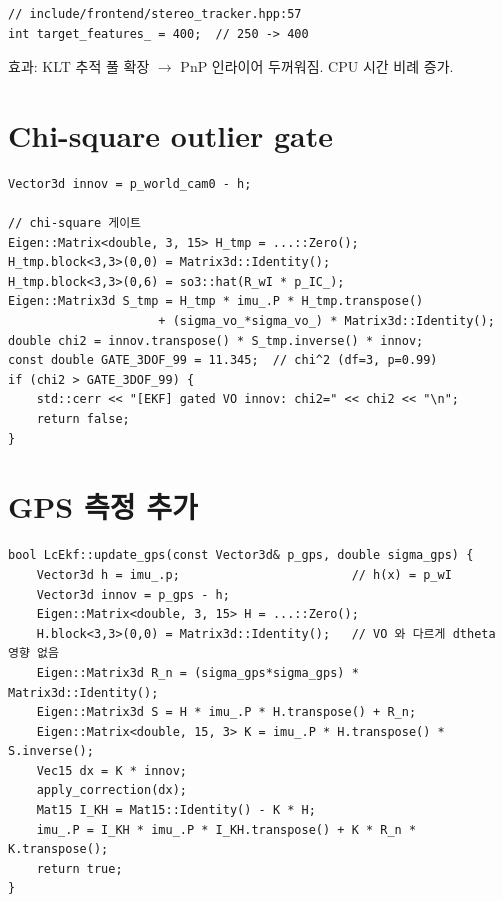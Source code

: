 \documentclass[11pt,a4paper,oneside]{report}
\begin{document}
\begin{lstlisting}[style=cpp]
// include/frontend/stereo_tracker.hpp:57
int target_features_ = 400;  // 250 -> 400
\end{lstlisting}

효과: KLT 추적 풀 확장 \(\to\) PnP 인라이어 두꺼워짐. CPU 시간 비례 증가.

\section{Chi-square outlier gate}

\begin{lstlisting}[style=cpp,caption={\texttt{src/ekf/lc\_ekf.cpp} innovation 직후}]
Vector3d innov = p_world_cam0 - h;

// chi-square 게이트
Eigen::Matrix<double, 3, 15> H_tmp = ...::Zero();
H_tmp.block<3,3>(0,0) = Matrix3d::Identity();
H_tmp.block<3,3>(0,6) = so3::hat(R_wI * p_IC_);
Eigen::Matrix3d S_tmp = H_tmp * imu_.P * H_tmp.transpose()
                     + (sigma_vo_*sigma_vo_) * Matrix3d::Identity();
double chi2 = innov.transpose() * S_tmp.inverse() * innov;
const double GATE_3DOF_99 = 11.345;  // chi^2 (df=3, p=0.99)
if (chi2 > GATE_3DOF_99) {
    std::cerr << "[EKF] gated VO innov: chi2=" << chi2 << "\n";
    return false;
}
\end{lstlisting}

\section{GPS 측정 추가}

\begin{lstlisting}[style=cpp,caption={새 메서드 \texttt{LcEkf::update\_gps}}]
bool LcEkf::update_gps(const Vector3d& p_gps, double sigma_gps) {
    Vector3d h = imu_.p;                        // h(x) = p_wI
    Vector3d innov = p_gps - h;
    Eigen::Matrix<double, 3, 15> H = ...::Zero();
    H.block<3,3>(0,0) = Matrix3d::Identity();   // VO 와 다르게 dtheta 영향 없음
    Eigen::Matrix3d R_n = (sigma_gps*sigma_gps) * Matrix3d::Identity();
    Eigen::Matrix3d S = H * imu_.P * H.transpose() + R_n;
    Eigen::Matrix<double, 15, 3> K = imu_.P * H.transpose() * S.inverse();
    Vec15 dx = K * innov;
    apply_correction(dx);
    Mat15 I_KH = Mat15::Identity() - K * H;
    imu_.P = I_KH * imu_.P * I_KH.transpose() + K * R_n * K.transpose();
    return true;
}
\end{lstlisting}


\end{document}
